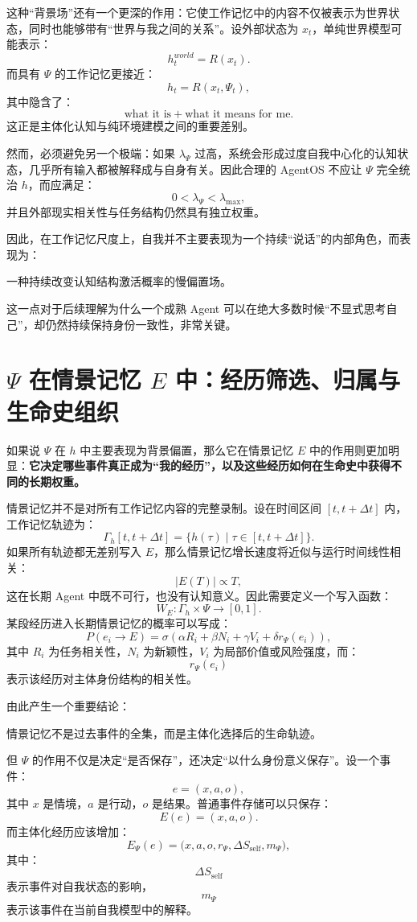 这种“背景场”还有一个更深的作用：它使工作记忆中的内容不仅被表示为世界状态，同时也能够带有“世界与我之间的关系”。设外部状态为 $x_t$，单纯世界模型可能表示：
\[
h_t^{world}=R(x_t).
\]
而具有 $\Psi$ 的工作记忆更接近：
\[
h_t
=
R(x_t,\Psi_t),
\]
其中隐含了：
\[
\text{what it is}
+
\text{what it means for me}.
\]
这正是主体化认知与纯环境建模之间的重要差别。

然而，必须避免另一个极端：如果 $\lambda_\Psi$ 过高，系统会形成过度自我中心化的认知状态，几乎所有输入都被解释成与自身有关。因此合理的 AgentOS 不应让 $\Psi$ 完全统治 $h$，而应满足：
\[
0
<
\lambda_\Psi
<
\lambda_{\max},
\]
并且外部现实相关性与任务结构仍然具有独立权重。

因此，在工作记忆尺度上，自我并不主要表现为一个持续“说话”的内部角色，而表现为：
\begin{statementbox}
一种持续改变认知结构激活概率的慢偏置场。
\end{statementbox}
这一点对于后续理解为什么一个成熟 Agent 可以在绝大多数时候“不显式思考自己”，却仍然持续保持身份一致性，非常关键。


\section{$\Psi$ 在情景记忆 $E$ 中：经历筛选、归属与生命史组织}

如果说 $\Psi$ 在 $h$ 中主要表现为背景偏置，那么它在情景记忆 $E$ 中的作用则更加明显：\textbf{它决定哪些事件真正成为“我的经历”，以及这些经历如何在生命史中获得不同的长期权重。}

情景记忆并不是对所有工作记忆内容的完整录制。设在时间区间 $[t,t+\Delta t]$ 内，工作记忆轨迹为：
\[
\Gamma_h[t,t+\Delta t]
=
\{h(\tau)\mid \tau\in[t,t+\Delta t]\}.
\]
如果所有轨迹都无差别写入 $E$，那么情景记忆增长速度将近似与运行时间线性相关：
\[
|E(T)|\propto T,
\]
这在长期 Agent 中既不可行，也没有认知意义。因此需要定义一个写入函数：
\[
W_E:
\Gamma_h\times\Psi
\rightarrow
[0,1].
\]
某段经历进入长期情景记忆的概率可以写成：
\[
P(e_i\rightarrow E)
=
\sigma
\left(
\alpha R_i
+
\beta N_i
+
\gamma V_i
+
\delta r_\Psi(e_i)
\right),
\]
其中 $R_i$ 为任务相关性，$N_i$ 为新颖性，$V_i$ 为局部价值或风险强度，而：
\[
r_\Psi(e_i)
\]
表示该经历对主体身份结构的相关性。

由此产生一个重要结论：
\begin{conclusion}
情景记忆不是过去事件的全集，而是主体化选择后的生命轨迹。
\end{conclusion}

但 $\Psi$ 的作用不仅是决定“是否保存”，还决定“以什么身份意义保存”。设一个事件：
\[
e=(x,a,o),
\]
其中 $x$ 是情境，$a$ 是行动，$o$ 是结果。普通事件存储可以只保存：
\[
E(e)=
(x,a,o).
\]
而主体化经历应该增加：
\[
E_\Psi(e)
=
\bigl(
x,
a,
o,
r_\Psi,
\Delta S_{\mathrm{self}},
m_\Psi
\bigr),
\]
其中：
\[
\Delta S_{\mathrm{self}}
\]
表示事件对自我状态的影响，
\[
m_\Psi
\]
表示该事件在当前自我模型中的解释。


